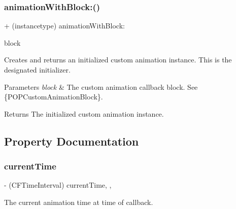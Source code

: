 \subsubsection{\texorpdfstring{animation\+With\+Block\+:()}{animationWithBlock:()}\hspace{0.1cm}{\footnotesize\ttfamily [3/3]}}
{\footnotesize\ttfamily + (instancetype) animation\+With\+Block\+: \begin{DoxyParamCaption}\item[{(P\+O\+P\+Custom\+Animation\+Block)}]{block }\end{DoxyParamCaption}}

Creates and returns an initialized custom animation instance.  This is the designated initializer. 
\begin{DoxyParams}{Parameters}
{\em block} & The custom animation callback block. See \{P\+O\+P\+Custom\+Animation\+Block\}. \\
\hline
\end{DoxyParams}
\begin{DoxyReturn}{Returns}
The initialized custom animation instance. 
\end{DoxyReturn}


\subsection{Property Documentation}
\mbox{\label{interface_p_o_p_custom_animation_a8dc8227a217bc8eaa5e5c54e39d56888}} 
\subsubsection{\texorpdfstring{current\+Time}{currentTime}}
{\footnotesize\ttfamily -\/ (C\+F\+Time\+Interval) current\+Time\hspace{0.3cm}{\ttfamily [read]}, {\ttfamily [nonatomic]}, {\ttfamily [assign]}}

The current animation time at time of callback. \mbox{\label{interface_p_o_p_custom_animation_a71d07606fdc11efd303df510259cc7f1}} 
